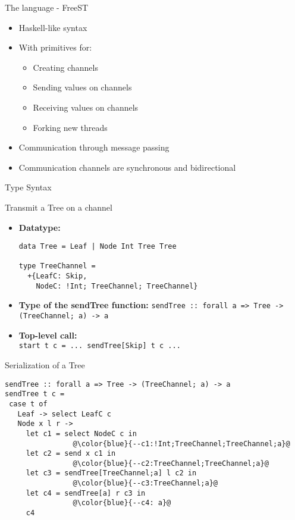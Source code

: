\documentclass[unknownkeysallowed]{beamer}
\begin{document}
\begin{frame}[fragile]{The language - FreeST}

  \begin{itemize}
  \item Haskell-like syntax
  \newline
  \item With primitives for:
    \begin{itemize}
    \item Creating channels
    \item Sending values on channels
    \item Receiving values on channels
    \item Forking new threads
    \end{itemize}
  \vspace{0.5cm}  
\item Communication through message passing
  \newline
\item Communication channels are synchronous and bidirectional 
  \end{itemize}  
\end{frame}

\begin{frame}[fragile]{Type Syntax}
    
\end{frame}


\begin{frame}[fragile]{Transmit a Tree on a channel}
  \begin{itemize}
  \item \textbf{Datatype:}
    \begin{lstlisting}
data Tree = Leaf | Node Int Tree Tree
      
type TreeChannel =
  +{LeafC: Skip,
    NodeC: !Int; TreeChannel; TreeChannel}
\end{lstlisting}
\vspace{0.3cm}
\item \textbf{Type of the sendTree function:}
  \lstinline|sendTree :: forall a => Tree -> (TreeChannel; a) -> a|
  \vspace{0.3cm}
\item \textbf{Top-level call:}\\
  \lstinline|start t c = ... sendTree[Skip] t c ...|
  \end{itemize}
\end{frame}

\begin{frame}[fragile]{Serialization of a Tree}
  \begin{lstlisting}
sendTree :: forall a => Tree -> (TreeChannel; a) -> a
sendTree t c =
 case t of
   Leaf -> select LeafC c
   Node x l r ->
     let c1 = select NodeC c in
                @\color{blue}{--c1:!Int;TreeChannel;TreeChannel;a}@
     let c2 = send x c1 in
                @\color{blue}{--c2:TreeChannel;TreeChannel;a}@
     let c3 = sendTree[TreeChannel;a] l c2 in
                @\color{blue}{--c3:TreeChannel;a}@
     let c4 = sendTree[a] r c3 in
                @\color{blue}{--c4: a}@
     c4
\end{lstlisting}
\end{frame}
\end{document}
